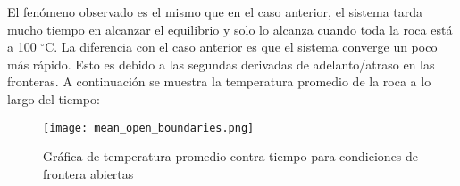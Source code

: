 \documentclass{article}
\begin{document}
El fenómeno observado es el mismo que en el caso anterior, el sistema tarda mucho tiempo en alcanzar el equilibrio y solo lo alcanza cuando toda la roca está a 100 $^\circ$C. La diferencia con el caso anterior es que el sistema converge un poco más rápido. Esto es debido a las segundas derivadas de adelanto/atraso en las fronteras. A continuación se muestra la temperatura promedio de la roca a lo largo del tiempo:

\begin{figure}[H]
    \centering
    \texttt{[image: mean\_open\_boundaries.png]}
    \caption{Gráfica de temperatura promedio contra tiempo para condiciones de frontera abiertas}
    \label{fig:my_label}
\end{figure}
\end{document}
